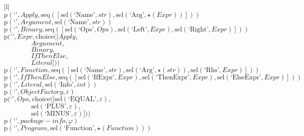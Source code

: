 \footnotesize\begin{center}\begin{tabular}{|l|}\hline
{}
\\\hline
$\mathrm{p}(\text{`'},\mathit{Apply},\mathrm{seq}\left(\left[\mathrm{sel}\left(\text{`Name'},str\right), \mathrm{sel}\left(\text{`Arg'},\star \left(\mathit{Expr}\right)\right)\right]\right))$	\\
$\mathrm{p}(\text{`'},\mathit{Argument},\mathrm{sel}\left(\text{`Name'},str\right))$	\\
$\mathrm{p}(\text{`'},\mathit{Binary},\mathrm{seq}\left(\left[\mathrm{sel}\left(\text{`Ops'},\mathit{Ops}\right), \mathrm{sel}\left(\text{`Left'},\mathit{Expr}\right), \mathrm{sel}\left(\text{`Right'},\mathit{Expr}\right)\right]\right))$	\\
$\mathrm{p}(\text{`'},\mathit{Expr},\mathrm{choice}([\mathit{Apply},$\\$\qquad\qquad\mathit{Argument},$\\$\qquad\qquad\mathit{Binary},$\\$\qquad\qquad\mathit{IfThenElse},$\\$\qquad\qquad\mathit{Literal}]))$	\\
$\mathrm{p}(\text{`'},\mathit{Function},\mathrm{seq}\left(\left[\mathrm{sel}\left(\text{`Name'},str\right), \mathrm{sel}\left(\text{`Arg'},\star \left(str\right)\right), \mathrm{sel}\left(\text{`Rhs'},\mathit{Expr}\right)\right]\right))$	\\
$\mathrm{p}(\text{`'},\mathit{IfThenElse},\mathrm{seq}\left(\left[\mathrm{sel}\left(\text{`IfExpr'},\mathit{Expr}\right), \mathrm{sel}\left(\text{`ThenExpr'},\mathit{Expr}\right), \mathrm{sel}\left(\text{`ElseExpr'},\mathit{Expr}\right)\right]\right))$	\\
$\mathrm{p}(\text{`'},\mathit{Literal},\mathrm{sel}\left(\text{`Info'},int\right))$	\\
$\mathrm{p}(\text{`'},\mathit{ObjectFactory},\varepsilon)$	\\
$\mathrm{p}(\text{`'},\mathit{Ops},\mathrm{choice}([\mathrm{sel}\left(\text{`EQUAL'},\varepsilon\right),$\\$\qquad\qquad\mathrm{sel}\left(\text{`PLUS'},\varepsilon\right),$\\$\qquad\qquad\mathrm{sel}\left(\text{`MINUS'},\varepsilon\right)]))$	\\
$\mathrm{p}(\text{`'},\mathit{package-info},\varphi)$	\\
$\mathrm{p}(\text{`'},\mathit{Program},\mathrm{sel}\left(\text{`Function'},\star \left(\mathit{Function}\right)\right))$	\\
\hline\end{tabular}\end{center}



